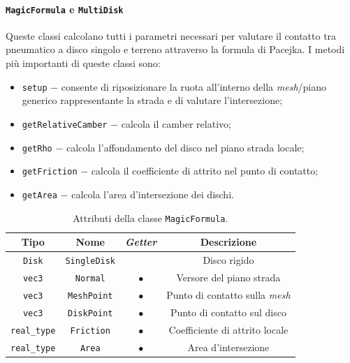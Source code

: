 \paragraph{\texttt{MagicFormula} e \texttt{MultiDisk}}
Queste classi calcolano tutti i parametri necessari per valutare il contatto tra pneumatico a disco singolo e terreno attraverso la formula di Pacejka. I metodi più importanti di queste classi sono:
\begin{itemize}
	\item \texttt{setup} $-$ consente di riposizionare la ruota all'interno della \textit{mesh}/piano generico rappresentante la strada e di valutare l'intersezione;
	\item \texttt{getRelativeCamber} $-$ calcola il camber relativo;
	\item \texttt{getRho} $-$ calcola l'affondamento del disco nel piano strada locale;
	\item \texttt{getFriction} $-$ calcola il coefficiente di attrito nel punto di contatto;
	\item \texttt{getArea} $-$ calcola l'area d'intersezione dei dischi.
\end{itemize}
%
\begin{table}[h!]
	\centering
	\begin{tabular}{|c|c|c|c|}
		\hline 
		\textbf{Tipo} & \textbf{Nome} & \textit{\textbf{Getter}} & \textbf{Descrizione} \\ \hline 
		\texttt{Disk} & \texttt{SingleDisk} &  & Disco rigido \\ \hline 
		\texttt{vec3} & \texttt{Normal} & $\bullet$ & Versore del piano strada \\ \hline
		\texttt{vec3} & \texttt{MeshPoint} & $\bullet$ & Punto di contatto sulla \textit{mesh} \\ \hline
		\texttt{vec3} & \texttt{DiskPoint} & $\bullet$ & Punto di contatto sul disco \\ \hline
		\texttt{real\_type} & \texttt{Friction} & $\bullet$ & Coefficiente di attrito locale \\ \hline
		\texttt{real\_type} & \texttt{Area} & $\bullet$ & Area d'intersezione \\ \hline
	\end{tabular}
	\caption{Attributi della classe \texttt{MagicFormula}.}
	\label{}
\end{table}
%
